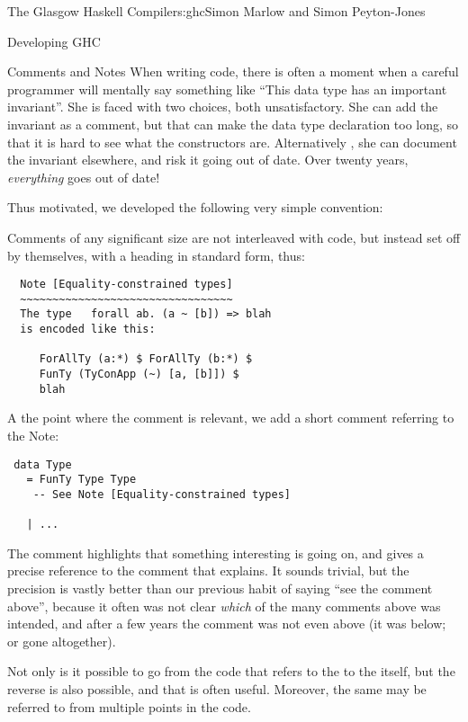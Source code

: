 \begin{aosachapter}{The Glasgow Haskell Compiler}{s:ghc}{Simon Marlow and Simon Peyton-Jones}
\begin{aosasect1}{Developing GHC}
\begin{aosasect2}{Comments and Notes}
When writing code, there is often a moment when a careful programmer
will mentally say something like ``This data type has an important
invariant''.  She is faced with two choices, both unsatisfactory.  She
can add the invariant as a comment, but that can make the data type
declaration too long, so that it is hard to see what the constructors
are.  Alternatively , she can document the invariant elsewhere, and
risk it going out of date.  Over twenty years, \emph{everything} goes
out of date!

Thus motivated, we developed the following very simple convention:

\begin{aosaitemize}

\item Comments of any significant size are not interleaved with code,
  but instead set off by themselves, with a heading in standard form,
  thus:

\begin{verbatim}
  Note [Equality-constrained types]
  ~~~~~~~~~~~~~~~~~~~~~~~~~~~~~~~~~
  The type   forall ab. (a ~ [b]) => blah
  is encoded like this:

     ForAllTy (a:*) $ ForAllTy (b:*) $
     FunTy (TyConApp (~) [a, [b]]) $
     blah
\end{verbatim}

\item A the point where the comment is relevant, we add a short
  comment referring to the Note:

\begin{verbatim}
 data Type
   = FunTy Type Type
	-- See Note [Equality-constrained types]

   | ...
\end{verbatim}

  The comment highlights that something interesting is going on, and
  gives a precise reference to the comment that explains.  It sounds
  trivial, but the precision is vastly better than our previous habit
  of saying ``see the comment above'', because it often was not clear
  \emph{which} of the many comments above was intended, and after a
  few years the comment was not even above (it was below; or gone
  altogether).

\end{aosaitemize}

Not only is it possible to go from the code that refers to the
 to the  itself, but the reverse is also
possible, and that is often useful.  Moreover, the same 
may be referred to from multiple points in the code.


\end{aosasect2}
\end{aosasect1}
\end{aosachapter}
